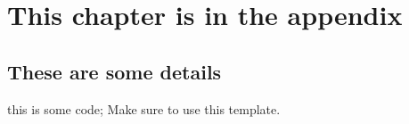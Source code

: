 \documentclass[12pt, a4paper]{report}
\newenvironment{code}
{\footnotesize\verbatim}{\endverbatim\normalfont}
\theoremstyle{definition}
\theoremstyle{definition}%
\theoremstyle{definition}%
\theoremstyle{definition}%
\theoremstyle{definition}%
\theoremstyle{definition}%
\begin{document}
\appendix

\chapter{This chapter is in the appendix}
\section{These are some details}
\begin{code}
this is some code;
Make sure to use this template.
\end{code}


\bibliomatter

 
 
\end{document}
